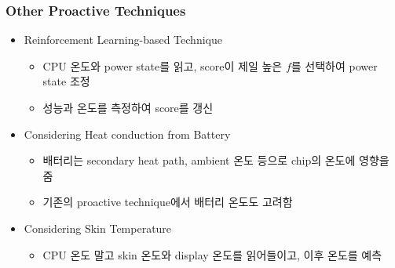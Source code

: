 \subsubsection*{Other Proactive Techniques}
\begin{itemize}
    \item Reinforcement Learning-based Technique
    \begin{itemize}
        \item CPU 온도와 power state를 읽고, score이 제일 높은 $f$를 선택하여 power state 조정
        \item 성능과 온도를 측정하여 score를 갱신
    \end{itemize}
    \item Considering Heat conduction from Battery
    \begin{itemize}
        \item 배터리는 secondary heat path, ambient 온도 등으로 chip의 온도에 영향을 줌
        \item 기존의 proactive technique에서 배터리 온도도 고려함
    \end{itemize}
    \item Considering Skin Temperature
    \begin{itemize}
        \item CPU 온도 말고 skin 온도와 display 온도를 읽어들이고, 이후 온도를 예측
    \end{itemize}
\end{itemize}
